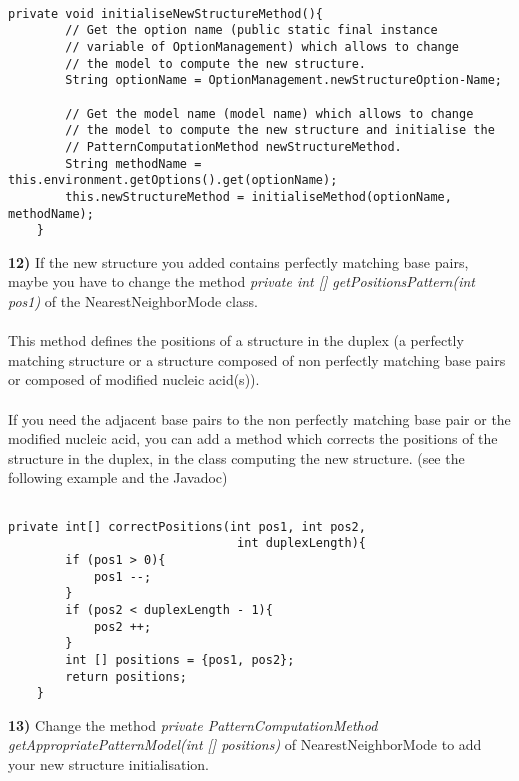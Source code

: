 \documentclass{article}
\begin{document}
\begin{verbatim}

private void initialiseNewStructureMethod(){
		// Get the option name (public static final instance 
		// variable of OptionManagement) which allows to change 
		// the model to compute the new structure.
		String optionName = OptionManagement.newStructureOption-Name;
		
		// Get the model name (model name) which allows to change 
		// the model to compute the new structure and initialise the 
		// PatternComputationMethod newStructureMethod.
		String methodName = this.environment.getOptions().get(optionName);
		this.newStructureMethod = initialiseMethod(optionName, methodName);
	}

\end{verbatim}

\textbf{12)} If the new structure you added contains perfectly matching base pairs, maybe you have to
change the method \textit{private int [] getPositionsPattern(int pos1)} of the NearestNeighborMode class.\\
\\
This method defines the positions of a structure in the duplex (a perfectly matching structure or a 
structure composed of non perfectly matching base pairs or composed of modified nucleic acid(s)). \\
\\
If you need the adjacent base pairs to the non perfectly matching base pair or the modified nucleic acid, 
you can add a method which corrects the positions of the structure in the duplex, in the class computing 
the new structure. (see the following example and the Javadoc)

\begin{verbatim}

private int[] correctPositions(int pos1, int pos2, 
                                int duplexLength){
		if (pos1 > 0){
			pos1 --;
		}
		if (pos2 < duplexLength - 1){
			pos2 ++;
		}
		int [] positions = {pos1, pos2};
		return positions;
	}

\end{verbatim}


\textbf{13)} Change the method \textit{private PatternComputationMethod getAppropriatePatternModel(int [] positions)}
of NearestNeighborMode to add your new structure initialisation.
\end{document}
